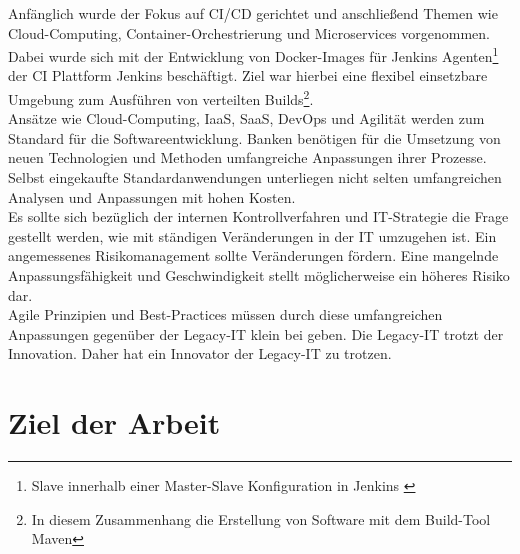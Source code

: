 Anfänglich wurde der Fokus auf CI/CD gerichtet und anschließend Themen wie Cloud-Computing, Container-Orchestrierung und Microservices vorgenommen. Dabei wurde sich mit der Entwicklung von Docker-Images für Jenkins Agenten\footnote{Slave innerhalb einer Master-Slave Konfiguration in Jenkins \cite{Google:GKEJenkins, Pathania2017}} der \ac{CI} Plattform Jenkins beschäftigt. Ziel war hierbei eine flexibel einsetzbare Umgebung zum Ausführen von verteilten Builds\footnote{In diesem Zusammenhang die Erstellung von Software mit dem Build-Tool Maven}.
\medskip
\\
Ansätze wie Cloud-Computing, \ac{IaaS}, \ac{SaaS}, DevOps und Agilität werden zum Standard für die Softwareentwicklung. Banken benötigen für die Umsetzung von neuen Technologien und Methoden umfangreiche Anpassungen ihrer Prozesse. Selbst eingekaufte Standardanwendungen unterliegen nicht selten umfangreichen Analysen und Anpassungen mit hohen Kosten. 
\medskip
\\
Es sollte sich bezüglich der internen Kontrollverfahren und IT-Strategie die Frage gestellt werden, wie mit ständigen Veränderungen in der IT umzugehen ist. Ein angemessenes Risikomanagement sollte Veränderungen fördern. Eine mangelnde Anpassungsfähigkeit und Geschwindigkeit stellt möglicherweise ein höheres Risiko dar.
\medskip
\\
Agile Prinzipien und Best-Practices müssen durch diese umfangreichen Anpassungen gegenüber der Legacy-IT klein bei geben. Die Legacy-IT trotzt der Innovation. Daher hat ein Innovator der Legacy-IT zu trotzen.
%
%
\section{Ziel der Arbeit}
\label{sec:intro:goal}

